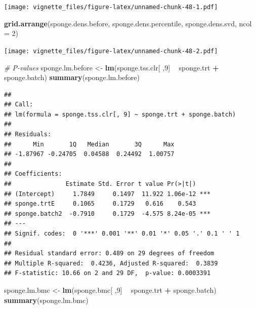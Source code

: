 \documentclass[]{book}
\newenvironment{Shaded}{\begin{snugshade}}{\end{snugshade}}
\newcommand{\KeywordTok}[1]{\textcolor[rgb]{0.13,0.29,0.53}{\textbf{#1}}}
\newcommand{\DataTypeTok}[1]{\textcolor[rgb]{0.13,0.29,0.53}{#1}}
\newcommand{\DecValTok}[1]{\textcolor[rgb]{0.00,0.00,0.81}{#1}}
\newcommand{\StringTok}[1]{\textcolor[rgb]{0.31,0.60,0.02}{#1}}
\newcommand{\CommentTok}[1]{\textcolor[rgb]{0.56,0.35,0.01}{\textit{#1}}}
\newcommand{\OperatorTok}[1]{\textcolor[rgb]{0.81,0.36,0.00}{\textbf{#1}}}
\newcommand{\NormalTok}[1]{#1}
\begin{document}
\texttt{[image: vignette\_files/figure-latex/unnamed-chunk-48-1.pdf]}

\begin{Shaded}
\begin{Highlighting}[]
\KeywordTok{grid.arrange}\NormalTok{(sponge.dens.before, sponge.dens.percentile, }
\NormalTok{             sponge.dens.svd, }\DataTypeTok{ncol =} \DecValTok{2}\NormalTok{)}
\end{Highlighting}
\end{Shaded}

\texttt{[image: vignette\_files/figure-latex/unnamed-chunk-48-2.pdf]}

\begin{Shaded}
\begin{Highlighting}[]
\CommentTok{# P-values}
\NormalTok{sponge.lm.before <-}\StringTok{ }\KeywordTok{lm}\NormalTok{(sponge.tss.clr[ ,}\DecValTok{9}\NormalTok{] }\OperatorTok{~}\StringTok{ }\NormalTok{sponge.trt }\OperatorTok{+}\StringTok{ }\NormalTok{sponge.batch)}
\KeywordTok{summary}\NormalTok{(sponge.lm.before)}
\end{Highlighting}
\end{Shaded}

\begin{verbatim}
## 
## Call:
## lm(formula = sponge.tss.clr[, 9] ~ sponge.trt + sponge.batch)
## 
## Residuals:
##      Min       1Q   Median       3Q      Max 
## -1.87967 -0.24705  0.04588  0.24492  1.00757 
## 
## Coefficients:
##               Estimate Std. Error t value Pr(>|t|)    
## (Intercept)     1.7849     0.1497  11.922 1.06e-12 ***
## sponge.trtE     0.1065     0.1729   0.616    0.543    
## sponge.batch2  -0.7910     0.1729  -4.575 8.24e-05 ***
## ---
## Signif. codes:  0 '***' 0.001 '**' 0.01 '*' 0.05 '.' 0.1 ' ' 1
## 
## Residual standard error: 0.489 on 29 degrees of freedom
## Multiple R-squared:  0.4236, Adjusted R-squared:  0.3839 
## F-statistic: 10.66 on 2 and 29 DF,  p-value: 0.0003391
\end{verbatim}

\begin{Shaded}
\begin{Highlighting}[]
\NormalTok{sponge.lm.bmc <-}\StringTok{ }\KeywordTok{lm}\NormalTok{(sponge.bmc[ ,}\DecValTok{9}\NormalTok{] }\OperatorTok{~}\StringTok{ }\NormalTok{sponge.trt }\OperatorTok{+}\StringTok{ }\NormalTok{sponge.batch)}
\KeywordTok{summary}\NormalTok{(sponge.lm.bmc)}
\end{Highlighting}
\end{Shaded}
\end{document}
